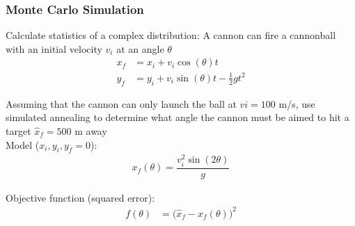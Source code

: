 \documentclass{beamer}
\begin{document}
\begin{frame}	
	\frametitle{Monte Carlo Simulation}
	
	\begin{exampleblock}{Calculate statistics of a complex distribution:}
		\small
		A cannon can fire a cannonball with an initial velocity $v_i$ at an angle $\theta$
		\begin{align*}
			x_f & = x_i + v_i \cos(\theta) t \\
			y_f & = y_i + v_i \sin(\theta) t - \frac{1}{2}gt^2
		\end{align*}
		
		Assuming that the cannon can only launch the ball at $vi = 100$ m/s, use simulated annealing to determine what angle the cannon must be aimed to hit a target $\hat x_f=500$ m away \\[10pt]
		
		Model ($x_i,y_i,y_f = 0$): \\[-20pt]
		\begin{align*}
			x_f(\theta) = \dfrac{v_i^2 \sin(2\theta)}{g}
		\end{align*}
				
		Objective function (squared error): \\[-20pt]
		\begin{align*}
			f(\theta) & = \Big(\hat x_f - x_f(\theta)\Big)^2
		\end{align*}
	\end{exampleblock}
	
\end{frame}
\end{document}
